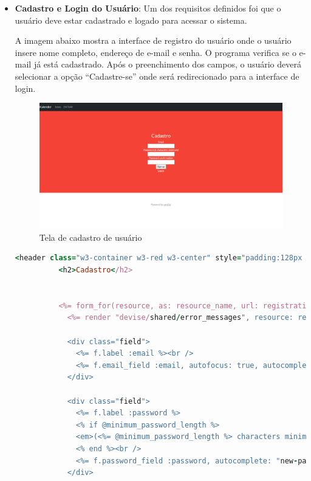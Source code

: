 \begin{itemize}
  \item \textbf{ Cadastro e Login do Usuário}:
        Um dos requisitos definidos foi que o usuário deve estar cadastrado e logado para acessar o sistema.

        A imagem abaixo mostra a interface de registro do usuário onde o usuário insere nome completo, endereço de e-mail e senha. O programa verifica se o e-mail já está cadastrado. Após o preenchimento dos campos, o usuário deverá selecionar a opção “Cadastre-se” onde será redirecionado para a interface de login.
        \begin{figure}[H]
          \begin{center}
            \includegraphics[width=12cm]{Pictures/interface/signup.png}
            \caption{Tela de cadastro de usuário} \label{singup}
          \end{center}
        \end{figure}
        \begin{lstlisting}[language=Ruby, caption=Interface de cadastro de usuário]
          <header class="w3-container w3-red w3-center" style="padding:128px 226px">
          <h2>Cadastro</h2>


          <%= form_for(resource, as: resource_name, url: registration_path(resource_name)) do |f| %>
            <%= render "devise/shared/error_messages", resource: resource %>

            <div class="field">
              <%= f.label :email %><br />
              <%= f.email_field :email, autofocus: true, autocomplete: "email" %>
            </div>

            <div class="field">
              <%= f.label :password %>
              <% if @minimum_password_length %>
              <em>(<%= @minimum_password_length %> characters minimum)</em>
              <% end %><br />
              <%= f.password_field :password, autocomplete: "new-password" %>
            </div>


\end{lstlisting}
\end{itemize}
